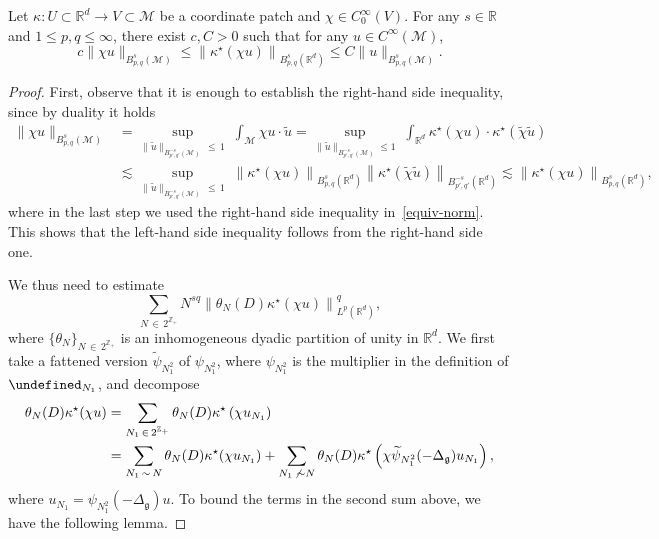 \documentclass[10pt]{amsart}
\theoremstyle{definition}\newtheorem{defi}[theo]{Definition}\newtheorem{rema}[theo]{Remark}\newtheorem{exam}[theo]{Example}\newtheorem{exem}[theo]{Example}\newtheorem{nota}[theo]{Notation}
\newcommand{\Z}{\mathbb{Z}}
\newcommand{\R}{\mathbb{R}}
\let\P= \undefined
\newcommand{\P}{\mathbf{P}}
\newcommand{\M}{\mathcal{M}}
\newcommand{\g}{\mathfrak{g}}
\newcommand{\Dlg}{\Delta_{\g}}
\newcommand{\kk}{\kappa}
\newcommand{\wt}{\widetilde}
\newcommand{\les}{\lesssim}
\begin{document}
\begin{prop}\label{prop-norm}
Let $\kk: U\subset \R^d\rightarrow V\subset\M$ be a coordinate patch and $\chi\in C^{\infty}_0(V)$. For any $s\in\R$ and $1\leq p,q\leq \infty$, there exist $c,C>0$ such that for any $u\in C^{\infty}(\M)$,
\begin{equation}\label{equiv-norm}
c\|\chi u\|_{B^s_{p,q}(\M)}\leq \left\|\kk^{\star}(\chi u)\right\|_{B^{s}_{p,q}(\R^d)}\leq C\|u\|_{B^s_{p,q}(\M)}.
\end{equation}
\end{prop}

\begin{proof}
First, observe that it is enough to establish the right-hand side inequality, since by duality it holds
\begin{align*}
\|\chi u\|_{B^s_{p,q}(\M)} &= \sup_{\|\wt u\|_{B^{-s}_{p',q'}(\M)}\,\le\,1}\;\int_\M \chi u\cdot\wt u = \sup_{\|\wt u\|_{B^{-s}_{p',q'}(\M)}\le 1} \;\int_{\R^d} \kk^{\star}(\chi u)\cdot\kk^{\star}(\wt\chi\wt u)\\
& \les \sup_{\|\wt u\|_{B^{-s}_{p',q'}(\M)}\,\le\, 1}\;\left\|\kk^{\star}(\chi u)\right\|_{B^s_{p,q}(\R^d)} \left\|\kk^{\star}(\wt\chi\wt u)\right\|_{B^{-s}_{p',q'}(\R^d)} \les \left\|\kk^{\star}(\chi u)\right\|_{B^s_{p,q}(\R^d)},
\end{align*}
where in the last step we used the right-hand side inequality in~\eqref{equiv-norm}. This shows that the left-hand side inequality follows from the right-hand side one.

We thus need to estimate
\begin{equation*}
\sum_{N\,\in\,2^{\Z_+}}N^{sq}\left\|\theta_N(D)\kk^{\star}(\chi u)\right\|_{L^p(\R^d)}^q,
\end{equation*}
where $\{\theta_N\}_{N\,\in\,2^{\Z_+}}$ is an inhomogeneous dyadic partition of unity in $\R^d$. We first take a fattened version $\widetilde{\psi}_{N_1^2}$ of $\psi_{N_1^2}$, where $\psi_{N_1^2}$ is the multiplier in the definition of $\P_{N_1}$, and decompose
\begin{align*}
\theta_N(D)\kk^{\star}(\chi u) &= \sum_{N_1\,\in \,2^{\Z_+}}\theta_N(D)\kk^{\star}\left(\chi u_{N_1}\right)\\
&=\sum_{N_1\,\sim\,N}\theta_N(D)\kk^{\star}(\chi u_{N_1})+\sum_{N_1\,\not\,\sim N}\theta_N(D)\kk^{\star}\left(\chi\widetilde{\psi}_{N_1^2}(-\Dlg)u_{N_1}\right),
\end{align*}
where $u_{N_1}=\psi_{N_1^2}(-\Dlg)u$. To bound the terms in the second sum above, we have the following lemma.


\end{proof}
\end{document}
